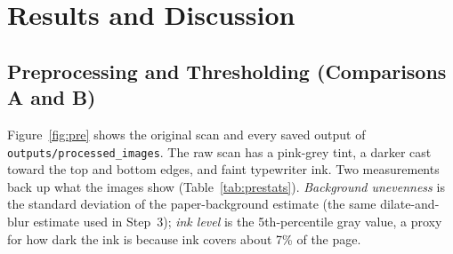 \documentclass[10pt,twocolumn]{article}
\begin{document}
\section{Results and Discussion}\label{sec:results}

\subsection{Preprocessing and Thresholding (Comparisons A and B)}\label{sec:pre}
Figure~\ref{fig:pre} shows the original scan and every saved output of \texttt{outputs/processed\_\allowbreak{}images}. The raw scan has a pink-grey tint, a darker cast toward the top and bottom edges, and faint typewriter ink. Two measurements back up what the images show (Table~\ref{tab:prestats}). \emph{Background unevenness} is the standard deviation of the paper-background estimate (the same dilate-and-blur estimate used in Step~3); \emph{ink level} is the 5th-percentile gray value, a proxy for how dark the ink is because ink covers about 7\% of the page.
\end{document}
